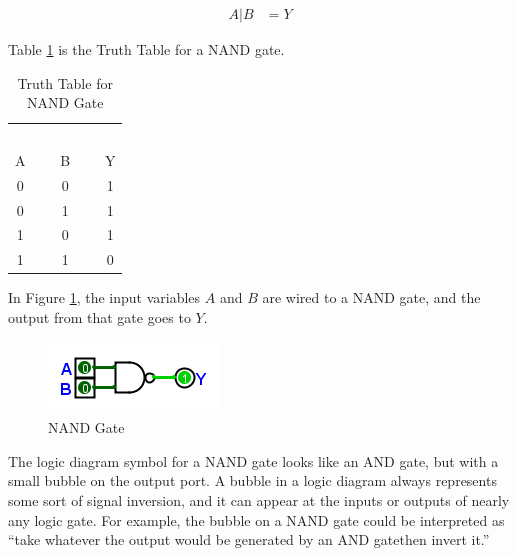 \begin{align}
  \label{BF:eq:nand_symbol}
  A | B &= Y 
\end{align}

Table \ref{BF:tab:truth_table_for_nand_gate} is the Truth Table for a \textsf{NAND}  gate.

\begin{table}[H]
  \sffamily
  \newcommand{\head}[1]{\textcolor{white}{\textbf{#1}}}    
  \begin{center}
    \begin{tabular}{ccc} 
      \rowcolor{black!75}
      \multicolumn{2}{c}{\head{Inputs}} & \head{Output} \\
      A & B & Y \\
      \hline
      0 & 0 & 1 \\
      0 & 1 & 1 \\
      1 & 0 & 1 \\
      1 & 1 & 0 
    \end{tabular}
  \end{center}
  \caption{Truth Table for \textsf{NAND}  Gate}
  \label{BF:tab:truth_table_for_nand_gate}
\end{table}

In Figure \ref{fig:04_05}, the input variables $ A $ and $ B $ are wired to a NAND gate, and the output from that gate goes to $ Y $.

\begin{figure}[H]
	\centering
	\includegraphics[width=\maxwidth{.95\linewidth}]{gfx/04_05}
	\caption{NAND Gate}
	\label{fig:04_05}
\end{figure}


The logic diagram symbol for a \textsf{NAND}  gate looks like an \textsf{AND} gate, but with a small bubble on the output port. A bubble in a logic diagram always represents some sort of signal inversion, and it can appear at the inputs or outputs of nearly any logic gate. For example, the bubble on a \textsf{NAND}  gate could be interpreted as ``take whatever the output would be generated by an \textsf{AND} gate\textemdash then invert it.'' 


